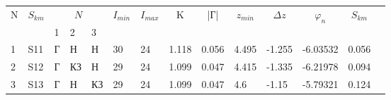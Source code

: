 
\begin{tabular}{|l|l|l|l|l|l|l|l|l|l|l|l|l|l}
\cline{1-13}
\multicolumn{1}{|c|}{\multirow{2}{*}{N}} & \multicolumn{1}{c|}{\multirow{2}{*}{$S_{km}$}} & \multicolumn{3}{c|}{$N_{}$} & \multicolumn{1}{c|}{\multirow{2}{*}{$I_{min}$}} & \multicolumn{1}{c|}{\multirow{2}{*}{$I_{max}$}} & \multicolumn{1}{c|}{\multirow{2}{*}{K}} & \multicolumn{1}{c|}{\multirow{2}{*}{|Г|}} & \multicolumn{1}{c|}{\multirow{2}{*}{$z_{min}$}} & \multicolumn{1}{c|}{\multirow{2}{*}{$\Delta z$}} & \multicolumn{1}{c|}{\multirow{2}{*}{$\varphi_n$}} & \multicolumn{1}{c|}{\multirow{2}{*}{$S_{km}$}} &  \\ \cline{3-5}
\multicolumn{1}{|c|}{}                   & \multicolumn{1}{c|}{}                          & 1      & 2       & 3      & \multicolumn{1}{c|}{}                           & \multicolumn{1}{c|}{}                           & \multicolumn{1}{c|}{}                   & \multicolumn{1}{c|}{}                     & \multicolumn{1}{c|}{}                           & \multicolumn{1}{c|}{}                            & \multicolumn{1}{c|}{}                             & \multicolumn{1}{c|}{}                          &  \\ \cline{1-13}
1                                        & S11                                            & Г      & Н       & Н      & 30                                              & 24                                              & 1.118                                   & 0.056                                     & 4.495                                           & -1.255                                           & -6.03532                                          & 0.056                                          &  \\ \cline{1-13}
2                                        & S12                                            & Г      & КЗ      & Н      & 29                                              & 24                                              & 1.099                                   & 0.047                                     & 4.415                                           & -1.335                                           & -6.21978                                          & 0.094                                          &  \\ \cline{1-13}
3                                        & S13                                            & Г      & Н       & КЗ     & 29                                              & 24                                              & 1.099                                   & 0.047                                     & 4.6                                             & -1.15                                            & -5.79321                                          & 0.124                                          &  \\ \cline{1-13}

\end{tabular}
